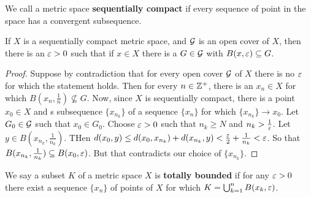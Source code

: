 \begin{definition}
    We call a metric space \textbf{sequentially compact} if every sequence of
    point in the space has a convergent subsequence.
\end{definition}

\begin{lemma}\label{2.4.3}
    If $X$ is a sequentially compact metric space, and  $\mathcal{G}$ is an open cover
    of  $X$, then there is an  $\varepsilon>0$ such that if  $x \in X$ there is a  $G \in
    \mathcal{G}$ with  $B(x,\varepsilon) \subseteq G$.
\end{lemma}
\begin{proof}
    Suppose by contradiction that for every open cover $\mathcal{G}$ of $X$ there is no
     $\varepsilon$ for which the statement holds. Then for every  $n \in \mathbb{Z}^+$, there is
     an  $x_n \in X$ for which  $B(x_n,\frac{1}{n}) \not\subseteq G$. Now, since
     $X$ is sequentially compact, there is a point  $x_0 \in X$ and s
     subsequence $\{x_{n_k}\}$ of a sequence $\{x_n\}$ for which $\{x_{n_k}\}
     \xrightarrow{} x_0$. Let $G_0 \in \mathcal{G}$ such that $x_0 \in G_0$. Choose
     $\varepsilon>0$ such that  $n_k \geq N$ and  $n_k>\frac{1}{\varepsilon}$. Let $y \in
     B(x_{n_k},\frac{1}{n_k})$. THen $d(x_0,y) \leq
     d(x_0,x_{n_k})+d(x_{n_k},y)<\frac{\varepsilon}{2}+\frac{1}{n_k}<\varepsilon$. So that
     $B(x_{n_k},\frac{1}{n_k}) \subseteq B(x_0, \varepsilon)$. But that contradicts our
     choice of $\{x_{n_k}\}$.
\end{proof}

\begin{definition}
    We say a subset $K$ of a metric space  $X$ is  \textbf{totally bounded} if
    for any $\varepsilon>0$ there exist a sequence $\{x_n\}$ of points of $X$ for which
    $K=\bigcup_{k=1}^n{B(x_k,\varepsilon)}$.
\end{definition}

